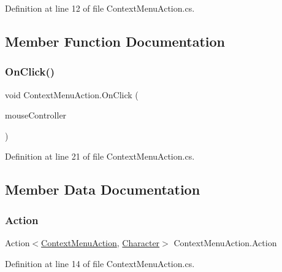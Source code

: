 Definition at line 12 of file Context\+Menu\+Action.\+cs.



\subsection{Member Function Documentation}
\mbox{\label{class_context_menu_action_a92e3d6b96a0bf30ae022298327b2658c}} 
\subsubsection{\texorpdfstring{On\+Click()}{OnClick()}}
{\footnotesize\ttfamily void Context\+Menu\+Action.\+On\+Click (\begin{DoxyParamCaption}\item[{\hyperlink{class_mouse_controller}{Mouse\+Controller}}]{mouse\+Controller }\end{DoxyParamCaption})}



Definition at line 21 of file Context\+Menu\+Action.\+cs.



\subsection{Member Data Documentation}
\mbox{\label{class_context_menu_action_a94571f3af1ba0a5f3e62d8ce6eece11a}} 
\subsubsection{\texorpdfstring{Action}{Action}}
{\footnotesize\ttfamily Action$<$\hyperlink{class_context_menu_action}{Context\+Menu\+Action}, \hyperlink{class_project_porcupine_1_1_entities_1_1_character}{Character}$>$ Context\+Menu\+Action.\+Action}



Definition at line 14 of file Context\+Menu\+Action.\+cs.

\mbox{\label{class_context_menu_action_a9755365125a54840753c035e69666673}} 
